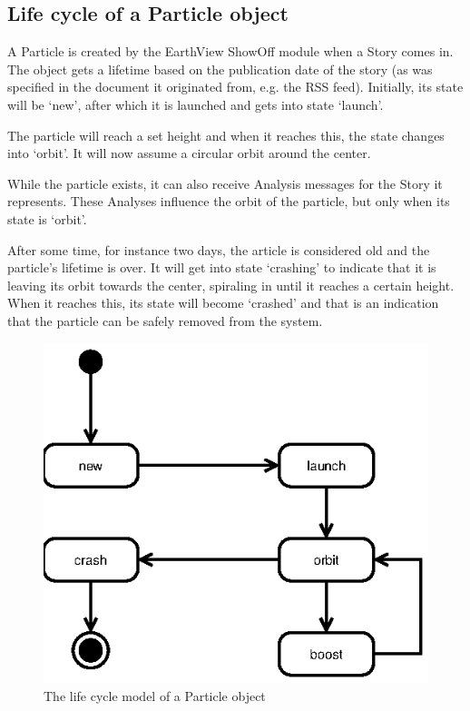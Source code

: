 \subsection{Life cycle of a Particle object}

A Particle is created by the EarthView ShowOff module when a Story comes in.
The object gets a lifetime based on the publication date of the story (as was
specified in the document it originated from, e.g. the RSS feed). Initially,
its state will be `new', after which it is launched and gets into state
`launch'.

The particle will reach a set height and when it reaches this, the state
changes into `orbit'. It will now assume a circular orbit around the center.

While the particle exists, it can also receive Analysis messages for the Story
it represents. These Analyses influence the orbit of the particle, but only
when its state is `orbit'.

After some time, for instance two days, the article is considered old and
the particle's lifetime is over. It will get into state `crashing' to
indicate that it is leaving its orbit towards the center, spiraling in
until it reaches a certain height. When it reaches this, its state will
become `crashed' and that is an indication that the particle can be safely
removed from the system.

\begin{figure}
  \centering
  \includegraphics{design/image/sequence-diagram-particle}
  \caption{The life cycle model of a Particle object}
\end{figure}
